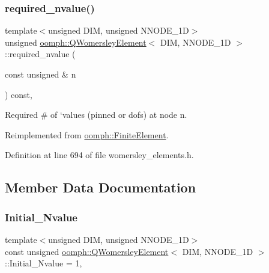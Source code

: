 \mbox{\label{classoomph_1_1QWomersleyElement_a31a20c3d89a4bc5698c81e01ca22dc8d}} 
\subsubsection{\texorpdfstring{required\+\_\+nvalue()}{required\_nvalue()}}
{\footnotesize\ttfamily template$<$unsigned D\+IM, unsigned N\+N\+O\+D\+E\+\_\+1D$>$ \\
unsigned \hyperlink{classoomph_1_1QWomersleyElement}{oomph\+::\+Q\+Womersley\+Element}$<$ D\+IM, N\+N\+O\+D\+E\+\_\+1D $>$\+::required\+\_\+nvalue (\begin{DoxyParamCaption}\item[{const unsigned \&}]{n }\end{DoxyParamCaption}) const\hspace{0.3cm}{\ttfamily [inline]}, {\ttfamily [virtual]}}



Required \# of `values\textquotesingle{} (pinned or dofs) at node n. 



Reimplemented from \hyperlink{classoomph_1_1FiniteElement_a56610c60d5bc2d7c27407a1455471b1a}{oomph\+::\+Finite\+Element}.



Definition at line 694 of file womersley\+\_\+elements.\+h.



\subsection{Member Data Documentation}
\mbox{\label{classoomph_1_1QWomersleyElement_ae91c242198d9b4683a446f711e6acd4b}} 
\subsubsection{\texorpdfstring{Initial\+\_\+\+Nvalue}{Initial\_Nvalue}}
{\footnotesize\ttfamily template$<$unsigned D\+IM, unsigned N\+N\+O\+D\+E\+\_\+1D$>$ \\
const unsigned \hyperlink{classoomph_1_1QWomersleyElement}{oomph\+::\+Q\+Womersley\+Element}$<$ D\+IM, N\+N\+O\+D\+E\+\_\+1D $>$\+::Initial\+\_\+\+Nvalue = 1\hspace{0.3cm}{\ttfamily [static]}, {\ttfamily [private]}}



